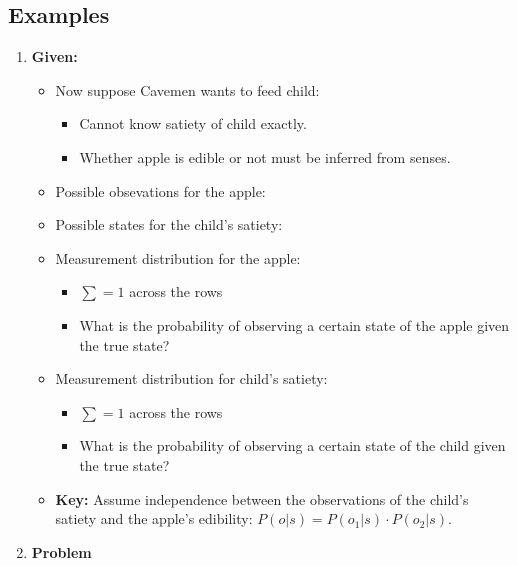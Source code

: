 \subsection{Examples}
\begin{example}
    \begin{enumerate}
        \item \textbf{Given:}
        \begin{itemize}
            \item Now suppose Cavemen wants to feed child: 
            \begin{itemize}
                \item Cannot know satiety of child exactly. 
                \item Whether apple is edible or not must be inferred from senses. 
            \end{itemize}
            \item Possible obsevations for the apple: 
            \item Possible states for the child's satiety:
            \item Measurement distribution for the apple: 
            \begin{itemize}
                \item $\sum = 1$ across the rows
                \item What is the probability of observing a certain state of the apple given the true state?
            \end{itemize}
            \item Measurement distribution for child's satiety:
            \begin{itemize}
                \item $\sum = 1$ across the rows
                \item What is the probability of observing a certain state of the child given the true state?
            \end{itemize}
            \item \textbf{Key:} Assume independence between the observations of the child's satiety and the apple's edibility: $P(o | s) = P(o_1 | s) \cdot P(o_2 | s)$.
        \end{itemize}
        \item \textbf{Problem}

\end{enumerate}
\end{example}
